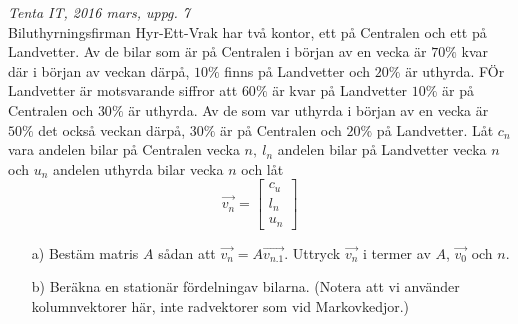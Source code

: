 {\it Tenta IT, 2016 mars, uppg. 7}\\
Biluthyrningsfirman Hyr-Ett-Vrak har två kontor, ett på Centralen och ett på Landvetter. Av de bilar som är på Centralen i början av en vecka är $70\%$ kvar där i början av veckan därpå, $10\%$ finns på Landvetter och $20\%$ är uthyrda. FÖr Landvetter är motsvarande siffror att $60\%$ är kvar på Landvetter $10\%$ är på Centralen och $30\%$ är uthyrda. Av de som var uthyrda i början av en vecka är $50\%$ det också veckan därpå, $30\%$ är på Centralen och $20\%$ på Landvetter. Låt $c_n$ vara andelen bilar på Centralen vecka $n,\ l_n$ andelen bilar på Landvetter vecka $n$ och $u_n$ andelen uthyrda bilar vecka $n$ och låt
$$\vec{v_n}=\begin{bmatrix}c_u\\l_n\\u_n\end{bmatrix}$$
\begin{itemize}
	\item[a) ] Bestäm matris $A$ sådan att $\vec{v_n}=A\vec{v_{n.1}}$. Uttryck $\vec{v_n}$ i termer av $A$, $\vec{v_0}$ och $n$.
	\item[b) ] Beräkna en stationär fördelningav bilarna. (Notera att vi använder kolumnvektorer här, inte radvektorer som vid Markovkedjor.)
\end{itemize}